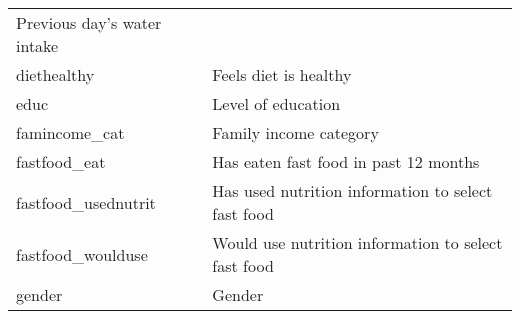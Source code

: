 \documentclass[]{article}
\begin{document}
\begin{longtable}[]{@{}ll@{}}
\begin{minipage}[t]{0.70\columnwidth}
Previous day's water intake\strut
\end{minipage}\tabularnewline
\begin{minipage}[t]{0.24\columnwidth}\raggedright
diethealthy\strut
\end{minipage} & \begin{minipage}[t]{0.70\columnwidth}\raggedright
Feels diet is healthy\strut
\end{minipage}\tabularnewline
\begin{minipage}[t]{0.24\columnwidth}\raggedright
educ\strut
\end{minipage} & \begin{minipage}[t]{0.70\columnwidth}\raggedright
Level of education\strut
\end{minipage}\tabularnewline
\begin{minipage}[t]{0.24\columnwidth}\raggedright
famincome\_cat\strut
\end{minipage} & \begin{minipage}[t]{0.70\columnwidth}\raggedright
Family income category\strut
\end{minipage}\tabularnewline
\begin{minipage}[t]{0.24\columnwidth}\raggedright
fastfood\_eat\strut
\end{minipage} & \begin{minipage}[t]{0.70\columnwidth}\raggedright
Has eaten fast food in past 12 months\strut
\end{minipage}\tabularnewline
\begin{minipage}[t]{0.24\columnwidth}\raggedright
fastfood\_usednutrit\strut
\end{minipage} & \begin{minipage}[t]{0.70\columnwidth}\raggedright
Has used nutrition information to select fast food\strut
\end{minipage}\tabularnewline
\begin{minipage}[t]{0.24\columnwidth}\raggedright
fastfood\_woulduse\strut
\end{minipage} & \begin{minipage}[t]{0.70\columnwidth}\raggedright
Would use nutrition information to select fast food\strut
\end{minipage}\tabularnewline
\begin{minipage}[t]{0.24\columnwidth}\raggedright
gender\strut
\end{minipage} & \begin{minipage}[t]{0.70\columnwidth}\raggedright
Gender\strut
\end{minipage}\tabularnewline

\end{longtable}
\end{document}

